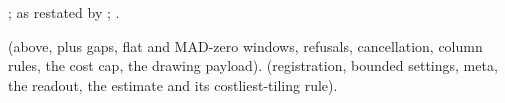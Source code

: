 \citet{costa2005multiscale}; \citet{wu2014analysis} as restated by \citet{azami2017refined};
\citet{richman2000physiological}.

 (above, plus gaps, flat and MAD-zero windows,
refusals, cancellation, column rules, the cost cap, the drawing payload).
 (registration, bounded settings, meta, the
readout, the estimate and its costliest-tiling rule).
